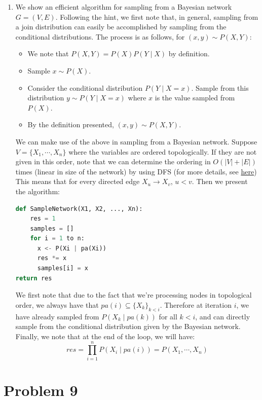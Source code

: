 \documentclass[12pt]{article}
\begin{document}
\begin{enumerate}
\item We show an efficient algorithm for sampling from a Bayesian network $G = (V,E)$. Following the hint, we first note that, in general, sampling from a join distribution can easily be accomplished by sampling from the conditional distributions. The process is as follows, for $(x,y) \sim P(X,Y)$:
\begin{itemize}
\item We note that $P(X,Y) = P(X)P(Y \mid X)$ by definition.
\item Sample $x \sim P(X)$.
\item Consider the conditional distribution $P(Y \mid X = x)$. Sample from this distribution $y \sim P(Y \mid X= x)$ where $x$ is the value sampled from $P(X)$.
\item By the definition presented, $(x,y) \sim P(X,Y)$.
\end{itemize}

We can make use of the above in sampling from a Bayesian network. Suppose $V = \{X_1, \cdots, X_n\}$ where the variables are ordered topologically. If they are not given in this order, note that we can determine the ordering in $O(|V| + |E|)$ times (linear in size of the network) by using DFS (for more details, see \href{https://en.wikipedia.org/wiki/Topological_sorting}{here}) This means that for every directed edge $X_u \to X_v$, $u < v$. Then we present the algorithm:
\begin{lstlisting}[language=Python]
def SampleNetwork(X1, X2, ..., Xn):
	res = 1
	samples = []
	for i = 1 to n:
	  x <- P(Xi | pa(Xi))
	  res *= x
	  samples[i] = x
return res
\end{lstlisting}
We first note that due to the fact that we're processing nodes in topological order, we always have that $pa(i) \subseteq \{X_k\}_{k < i}$. Therefore at iteration $i$, we have already sampled from $P(X_k \mid pa(k))$ for all $k < i$, and can directly sample from the conditional distribution given by the Bayesian network. Finally, we note that at the end of the loop, we will have:
$$
res = \prod_{i=1}^{n}P(X_i \mid pa(i)) = P(X_1, \cdots, X_n)
$$
\end{enumerate}

\pagebreak
\section*{Problem 9}
\end{document}
